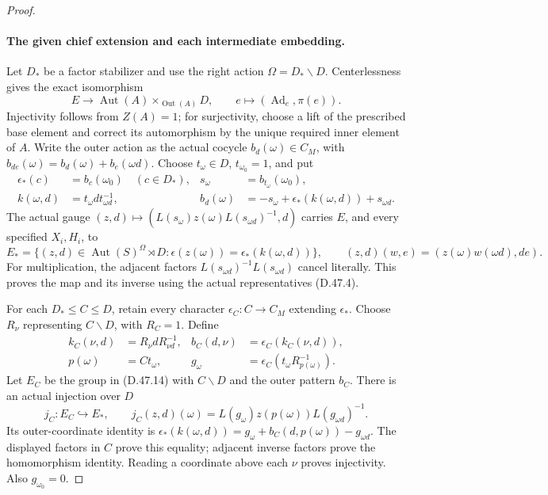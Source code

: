 \begin{proof}
\paragraph{The given chief extension and each intermediate embedding.}
Let \(D_*\) be a factor stabilizer and use the right action
\(\Omega=D_*\backslash D\). Centerlessness gives the exact
isomorphism
\[
 E\longrightarrow\operatorname{Aut}(A)
             \mathbin{\times_{\operatorname{Out}(A)}}D,
          \qquad e\longmapsto(\operatorname{Ad}_e,\pi(e)).
 \tag{D.47.12}
\]
Injectivity follows from \(Z(A)=1\); for surjectivity,
choose a lift of the prescribed base element and correct
its automorphism by the unique required inner element of
\(A\).
Write the outer action as the actual cocycle
\(b_d(\omega)\in C_M\), with
\(b_{de}(\omega)=b_d(\omega)+b_e(\omega d)\).
Choose \(t_\omega\in D\), \(t_{\omega_0}=1\), and put
\[
 \begin{aligned}
 \epsilon_*(c)&=b_c(\omega_0)\quad(c\in D_*),&
 s_\omega&=b_{t_\omega}(\omega_0),\\
 k(\omega,d)&=t_\omega d t_{\omega d}^{-1},&
 b_d(\omega)&=-s_\omega+\epsilon_*(k(\omega,d))+s_{\omega d}.
 \end{aligned}
 \tag{D.47.13}
\]
The actual gauge
\((z,d)\mapsto(L(s_\omega)z(\omega)L(s_{\omega d})^{-1},d)\)
carries \(E\), and every specified \(X_i,H_i\), to
\[
 E_*=
 \{(z,d)\in\operatorname{Aut}(S)^\Omega\rtimes D:
             \epsilon(z(\omega))=\epsilon_*(k(\omega,d))\},
 \qquad
 (z,d)(w,e)=(z(\omega)w(\omega d),de).
 \tag{D.47.14}
\]
For multiplication, the adjacent factors
\(L(s_{\omega d})^{-1}L(s_{\omega d})\) cancel literally.
This proves the map and its inverse using the actual
representatives \textup{(D.47.4)}.

For each \(D_*\leq C\leq D\), retain every character
\(\epsilon_C:C\to C_M\) extending \(\epsilon_*\).
Choose \(R_\nu\) representing \(C\backslash D\), with
\(R_C=1\). Define
\[
 \begin{aligned}
 k_C(\nu,d)&=R_\nu dR_{\nu d}^{-1},&
 b_C(d,\nu)&=\epsilon_C(k_C(\nu,d)),\\
 p(\omega)&=Ct_\omega,&
 g_\omega&=\epsilon_C(t_\omega R_{p(\omega)}^{-1}).
 \end{aligned}
 \tag{D.47.15}
\]
Let \(E_C\) be the group in \textup{(D.47.14)} with
\(C\backslash D\) and the outer pattern \(b_C\).
There is an actual injection over \(D\)
\[
 j_C:E_C\hookrightarrow E_* ,\qquad
 j_C(z,d)(\omega)=L(g_\omega)z(p(\omega))L(g_{\omega d})^{-1}.
 \tag{D.47.16}
\]
Its outer-coordinate identity is
\(\epsilon_*(k(\omega,d))=
g_\omega+b_C(d,p(\omega))-g_{\omega d}\).
The displayed factors in \(C\) prove this equality;
adjacent inverse factors prove the homomorphism identity.
Reading a coordinate above each \(\nu\) proves injectivity.
Also \(g_{\omega_0}=0\).


\end{proof}
